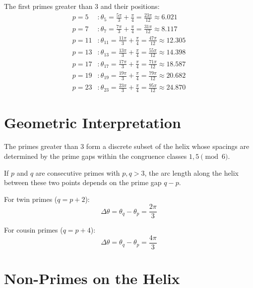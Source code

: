 \begin{example}
The first primes greater than 3 and their positions:
\begin{align*}
p = 5 &: \theta_5 = \frac{5\pi}{3} + \frac{\pi}{4} = \frac{23\pi}{12} \approx 6.021\\
p = 7 &: \theta_7 = \frac{7\pi}{3} + \frac{\pi}{4} = \frac{31\pi}{12} \approx 8.117\\
p = 11 &: \theta_{11} = \frac{11\pi}{3} + \frac{\pi}{4} = \frac{47\pi}{12} \approx 12.305\\
p = 13 &: \theta_{13} = \frac{13\pi}{3} + \frac{\pi}{4} = \frac{55\pi}{12} \approx 14.398\\
p = 17 &: \theta_{17} = \frac{17\pi}{3} + \frac{\pi}{4} = \frac{71\pi}{12} \approx 18.587\\
p = 19 &: \theta_{19} = \frac{19\pi}{3} + \frac{\pi}{4} = \frac{79\pi}{12} \approx 20.682\\
p = 23 &: \theta_{23} = \frac{23\pi}{3} + \frac{\pi}{4} = \frac{95\pi}{12} \approx 24.870
\end{align*}
\end{example}

\section{Geometric Interpretation}

\begin{corollary}
The primes greater than 3 form a discrete subset of the helix whose spacings are determined by the prime gaps within the congruence classes $1, 5 \pmod{6}$.
\end{corollary}

\begin{remark}
If $p$ and $q$ are consecutive primes with $p, q > 3$, the arc length along the helix between these two points depends on the prime gap $q - p$.

For twin primes ($q = p + 2$):
\[
\Delta\theta = \theta_q - \theta_p = \frac{2\pi}{3}
\]

For cousin primes ($q = p + 4$):
\[
\Delta\theta = \theta_q - \theta_p = \frac{4\pi}{3}
\]
\end{remark}

\section{Non-Primes on the Helix}\label{sec:nicht_prim}

